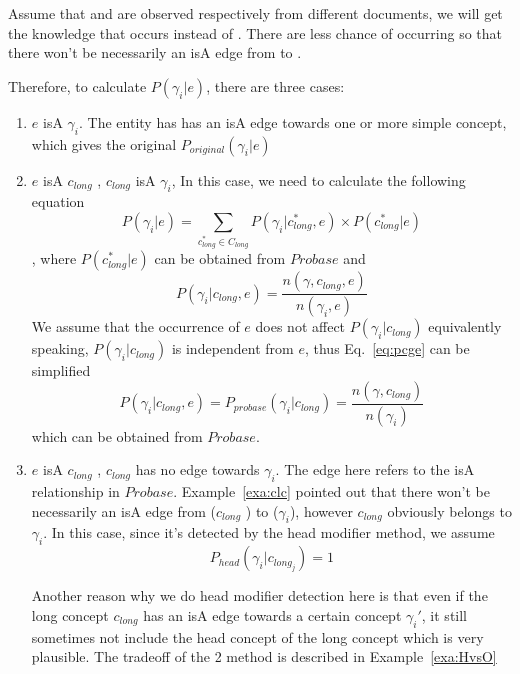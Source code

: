 \begin{example}
\label{exa:clc}
Assume that   and  are observed respectively  from different documents, we will get the knowledge that  occurs  instead of . There are less chance of occurring  so that there won't be necessarily an isA edge from  to .
\end{example}


Therefore, to calculate  $P(\gamma_i|e)$, there are three cases:

\begin{enumerate}

\item $e$ isA $\gamma_i$. The entity has has an isA edge towards one or more simple concept, which gives the original $P_{original}(\gamma_i|e)$

\item $e$ isA $c_{long}$ , $c_{long} $ isA $\gamma_i$, In this case, we need to calculate the following equation
$$P(\gamma_i|e) = \sum_{c_{long}^*\in C_{long}}   P(\gamma_i|c_{long}^*,e)   \times    P(c_{long}^*|e) $$
, where $P(c_{long}^*|e)$ can be obtained from $Probase$ and
\begin{equation}P(\gamma_i|c_{long},e) = \frac{n(\gamma,c_{long}, e)}{n(\gamma_i, e)}\label{eq:pcge}\end{equation}
We assume that the occurrence of $e$ does not affect $P(\gamma_i|c_{long})$ equivalently speaking, $P(\gamma_i|c_{long})$ is independent from $e$, thus Eq.~\ref{eq:pcge} can be simplified
$$P(\gamma_i|c_{long},e) =P_{probase}(\gamma_i|c_{long}) = \frac{n(\gamma,c_{long})}{n(\gamma_i)}$$
which can be obtained from $Probase$.

\item $e$ isA $c_{long}$ , $c_{long}$ has no edge towards $\gamma_i$. The edge here refers to the isA relationship in $Probase$. Example~\ref{exa:clc} pointed out that there won't be necessarily an isA edge from ($c_{long}$ ) to ($\gamma_i$), however $c_{long}$ obviously belongs to $\gamma_i$. In this case, since it's detected by the head modifier method, we assume
    $$P_{head}(\gamma_i|c_{long_j})=1 $$

    Another reason why we do head modifier detection here is that even if the long concept $c_{long}$ has an isA edge towards a certain concept $\gamma_i'$, it still sometimes not include the head concept of the long concept which is very plausible. The tradeoff of the 2 method is described in Example~\ref{exa:HvsO}

\end{enumerate}

